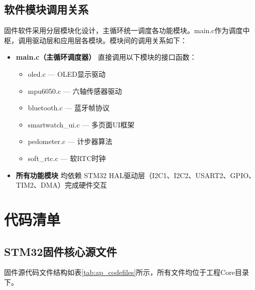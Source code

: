 \FloatBarrier

\subsection{软件模块调用关系}
固件软件采用分层模块化设计，主循环统一调度各功能模块。main.c作为调度中枢，调用驱动层和应用层各模块。模块间的调用关系如下：

\begin{itemize}
    \item \textbf{main.c（主循环调度器）} 直接调用以下模块的接口函数：
    \begin{itemize}
        \item oled.c — OLED显示驱动
        \item mpu6050.c — 六轴传感器驱动
        \item bluetooth.c — 蓝牙帧协议
        \item smartwatch\_ui.c — 多页面UI框架
        \item pedometer.c — 计步器算法
        \item soft\_rtc.c — 软RTC时钟
    \end{itemize}
    \item \textbf{所有功能模块} 均依赖 STM32 HAL驱动层（I2C1、I2C2、USART2、GPIO、TIM2、DMA）完成硬件交互
\end{itemize}

\FloatBarrier

\section{\centering 代码清单}

\subsection{STM32固件核心源文件}
固件源代码文件结构如表\ref{tab:ap_codefiles}所示，所有文件均位于工程Core目录下。

